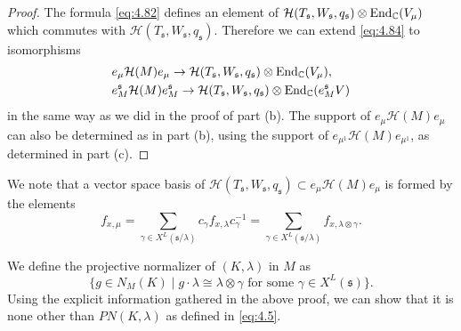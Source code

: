 \documentclass[11pt]{amsart}
\theoremstyle{definition}
\begin{document}
\begin{proof}
The formula \eqref{eq:4.82} defines an element of ${{\mathcal H}} (T_{{\mathfrak s}}, W_{{\mathfrak s}}, q_{{\mathfrak s}}) \otimes 
{{\rm End}}_{\mathbb C} (V_\mu)$ which commutes with ${{\mathcal H}} (T_{{\mathfrak s}}, W_{{\mathfrak s}}, q_{{\mathfrak s}})$. Therefore we can
extend \eqref{eq:4.84} to isomorphisms
\begin{align*}
& e_{\mu } {{\mathcal H}} (M) e_{\mu } \to {{\mathcal H}} (T_{{\mathfrak s}}, W_{{\mathfrak s}}, q_{{\mathfrak s}}) \otimes {{\rm End}}_{\mathbb C} (V_\mu ), \\
& e^{{\mathfrak s}}_M {{\mathcal H}} (M) e^{{\mathfrak s}}_M \to {{\mathcal H}} (T_{{\mathfrak s}}, W_{{\mathfrak s}}, q_{{\mathfrak s}}) \otimes {{\rm End}}_{\mathbb C} (e_M^{{\mathfrak s}} V)
\end{align*}
in the same way as we did in the proof of part (b). The support of 
$e_\mu {{\mathcal H}} (M) e_\mu$ can also be determined as in part (b), using the support
of $e_{\mu^1} {{\mathcal H}} (M) e_{\mu^1}$, as determined in part (c).
\end{proof}

We note that a vector space basis of ${{\mathcal H}} (T_{{\mathfrak s}}, W_{{\mathfrak s}}, q_{{\mathfrak s}}) \subset e_{\mu } 
{{\mathcal H}} (M) e_{\mu }$ is formed by the elements \label{i:17}
\begin{equation} \label{eq:4.85} 
f_{x,\mu } = \sum_{\gamma \in X^L ({{\mathfrak s}} / \lambda)} c_\gamma f_{x,\lambda} c_\gamma^{-1}
= \sum_{\gamma \in X^L ({{\mathfrak s}} / \lambda)} f_{x,\lambda \otimes \gamma} .
\end{equation}

We define the projective normalizer of $(K,\lambda)$ in $M$ as 
\begin{equation}\label{eq:3.34} 
\{ g \in N_{M}(K) \mid g \cdot \lambda \cong \lambda \otimes \gamma
\text{ for some } \gamma \in X^L ({{\mathfrak s}}) \} .
\end{equation}
Using the explicit information gathered in the above proof, 
we can show that it is none other than $PN (K,\lambda)$ as defined in \eqref{eq:4.5}.
\end{document}
